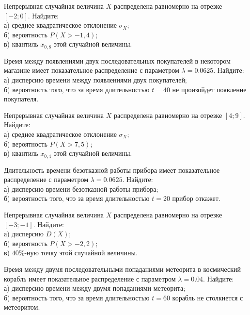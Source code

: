 \vfill

\newpage\setcounter{zad}{0}

\z Непрерывная случайная величина $X$ распределена равномерно на отрезке $[-2; 0]$. Найдите: \\ \quad а) среднее квадратическое отклонение $\sigma_X$; \\ \quad б) вероятность $P(X>-1{,}4)$; \\ \quad в) квантиль $x_{0{,}8}$ этой случайной величины.


\vfill

\z Время между появлениями двух последовательных покупателей в некотором магазине имеет показательное распределение с параметром $\lambda = 0.0625$. Найдите: \\ \quad а) дисперсию времени между появлениями двух покупателей; \\ \quad б) вероятность того, что за время длительностью $t = 40$ не произойдет появление покупателя.
 

\vfill

\newpage\setcounter{zad}{0}

\z Непрерывная случайная величина $X$ распределена равномерно на отрезке $[4; 9]$. Найдите: \\ \quad а) среднее квадратическое отклонение $\sigma_X$; \\ \quad б) вероятность $P(X>7{,}5)$; \\ \quad в) квантиль $x_{0{,}4}$ этой случайной величины.


\vfill

\z Длительность времени безотказной работы прибора имеет показательное распределение с параметром $\lambda = 0.0625$. Найдите: \\ \quad а) дисперсию времени безотказной работы прибора; \\ \quad б) вероятность того, что за время длительностью $t = 20$ прибор  откажет.
 

\vfill

\newpage\setcounter{zad}{0}

\z Непрерывная случайная величина $X$ распределена равномерно на отрезке $[-3; -1]$. Найдите: \\ \quad а) дисперсию $D(X)$; \\ \quad б) вероятность $P(X>-2{,}2)$; \\ \quad в) $40\%$-ную точку этой случайной величины.


\vfill

\z Время между двумя последовательными попаданиями метеорита в космический корабль имеет показательное распределение с параметром $\lambda = 0.04$. Найдите: \\ \quad а) дисперсию времени между двумя попаданиями метеорита; \\ \quad б) вероятность того, что за время длительностью $t = 60$ корабль не столкнется с метеоритом.
 

